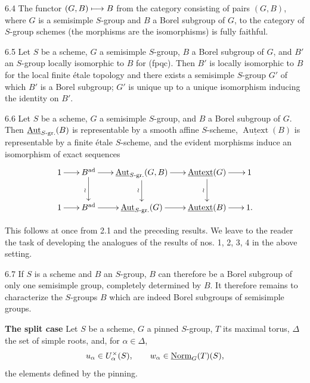 \begin{corollary}{6.4}\label{XXIV.6.4}
The functor $(G,B)\longmapsto B$ from the category consisting of pairs $(G,B)$, where $G$ is a semisimple $S$-group and $B$ a Borel subgroup of $G$, to the category of $S$-group schemes (the morphisms are the isomorphisms) is fully faithful.
\end{corollary}
\begin{corollary}{6.5}\label{XXIV.6.5}
Let $S$ be a scheme, $G$ a semisimple $S$-group, $B$ a Borel subgroup of $G$, and $B'$ an $S$-group locally isomorphic to $B$ for (fpqc). Then $B'$ is locally isomorphic to $B$ for the local finite étale topology and there exists a semisimple $S$-group $G'$ of which $B'$ is a Borel subgroup; $G'$ is unique up to a unique isomorphism inducing the identity on $B'$.
\end{corollary}
\begin{corollary}{6.6}\label{XXIV.6.6}
Let $S$ be a scheme, $G$ a semisimple $S$-group, and $B$ a Borel subgroup of $G$. Then $\underline{\operatorname{Aut}}_{S\text{-gr.}}(B)$ is representable by a smooth affine $S$-scheme, $\underline{\operatorname{Autext}}(B)$ is representable by a finite étale $S$-scheme, and the evident morphisms induce an isomorphism of exact sequences
\[
\xymatrix@C=1.8em{
1\ar[r]&B^{\mathrm{ad}}\ar[r]\ar[d]_{\wr}&\underline{\Aut}_{S\text{-gr.}}(G,B)\ar[r]\ar[d]_{\wr}&\underline{\operatorname{Autext}}(G)\ar[r]\ar[d]_{\wr}&1\\
1\ar[r]&B^{\mathrm{ad}}\ar[r]&\underline{\Aut}_{S\text{-gr.}}(G)\ar[r]&\underline{\operatorname{Autext}}(B)\ar[r]&1.}
\]
\end{corollary}
This follows at once from 2.1 and the preceding results. We leave to the reader the task of developing the analogues of the results of nos. 1, 2, 3, 4 in the above setting.
\begin{remark}{6.7}\label{XXIV.6.7}
If $S$ is a scheme and $B$ an $S$-group, $B$ can therefore be a Borel subgroup of only one semisimple group, completely determined by $B$. It therefore remains to characterize the $S$-groups $B$ which are indeed Borel subgroups of semisimple groups.
\end{remark}

\label{XXIV.7.1}\textbf{The split case}
\label{XXIV.7.1.1}
Let $S$ be a scheme, $G$ a pinned $S$-group, $T$ its maximal torus, $\Delta$ the set of simple roots, and, for $\alpha\in\Delta$,
\[
u_\alpha\in U_\alpha^\times(S),\qquad w_\alpha\in\underline{\mathrm{Norm}}_G(T)(S),
\]
the elements defined by the pinning.
